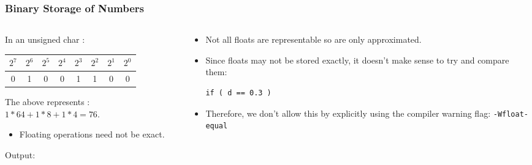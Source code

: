 \begin{frame}[fragile]
\frametitle{Binary Storage of Numbers}

\begin{columns}

\begin{column}{0.45\textwidth}
In an unsigned char :
\begin{center}
\begin{tabular}{|c|c|c|c|c|c|c|c|}\hline
$2^7$ & $2^6$ & $2^5$ & $2^4$ & $2^3$ & $2^2$ & $2^1$ & $2^0$ \\ \hline
0     & 1     & 0     & 0     & 1     & 1     & 0     & 0     \\ \hline
\end{tabular}
\end{center}

The above represents : $1 * 64 + 1 * 8 + 1 * 4 = 76$.

\begin{itemize}[<+->]
\item Floating operations need not be exact.
\end{itemize}

{\scriptsize Output:}

\end{column}

\begin{column}{0.45\textwidth}
\begin{itemize}[<+->]
\item Not all floats are representable so are only approximated.
\item Since floats may not be stored exactly, it doesn't make sense to try and compare them:
\begin{lstlisting}[style=basicc,numbers=none]
if ( d == 0.3 )
\end{lstlisting}
\item Therefore, we don't allow this by explicitly using the compiler warning flag: {\tt -Wfloat-equal}
\end{itemize}
\end{column}

\end{columns}
\end{frame}


